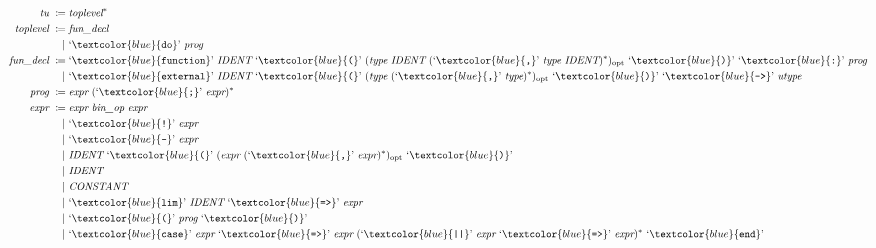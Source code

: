 \documentclass[a4paper,11pt,parskip=half]{scrartcl}
\newcommand*\lang[1]{\text`\textcolor{blue}{\text{\ttfamily{#1}}}\text'{}}
\newcommand*\optional[1]{#1\ensuremath{{}_{\textrm{opt}}}}
\begin{document}
\begin{figure}
\begin{align*}
\emph{tu}~\coloneqq{}& \emph{toplevel}^* \\
%
\emph{toplevel}~\coloneqq{}& \emph{fun\_decl} \\
	|~& \lang{do}~ \emph{prog} \\
%
\emph{fun\_decl}~\coloneqq{}& \lang{function}~ \emph{IDENT}~  \lang{(}~ \optional{(\emph{type}~ \emph{IDENT}~ (\lang{,}~ \emph{type}~ \emph{IDENT})^*)}~ \lang{)}~ \lang{:}~ \emph{prog} \\
	|~& \lang{external}~ \emph{IDENT}~ \lang{(}~ \optional{(\emph{type}~ (\lang{,}~ \emph{type})^*)}~ \lang{)}~ \lang{->}~ \emph{utype} \\
%
\emph{prog}~\coloneqq{}& \emph{expr}~(\lang{;}~ \emph{expr})^* \\
%
\emph{expr}~\coloneqq{}& \emph{expr}~ \emph{bin\_op}~ \emph{expr} \\
	|~& \lang{!}~ \emph{expr} \\
	|~& \lang{-}~ \emph{expr} \\
	|~& \emph{IDENT}~ \lang{(}~ \optional{(\emph{expr}~(\lang,~\emph{expr})^*)}~ \lang{)} \\
	|~& \emph{IDENT} \\
	|~& \emph{CONSTANT} \\
	|~& \lang{lim}~ \emph{IDENT}~  \lang{=>}~ \emph{expr} \\
	|~& \lang{(}~ \emph{prog}~ \lang{)} \\
	|~& \lang{case}~ \emph{expr}~ \lang{=>}~ \emph{expr}~ (\lang{||}~ \emph{expr}~ \lang{=>}~ \emph{expr})^*~ \lang{end} \\

\end{align*}
\end{figure}
\end{document}
